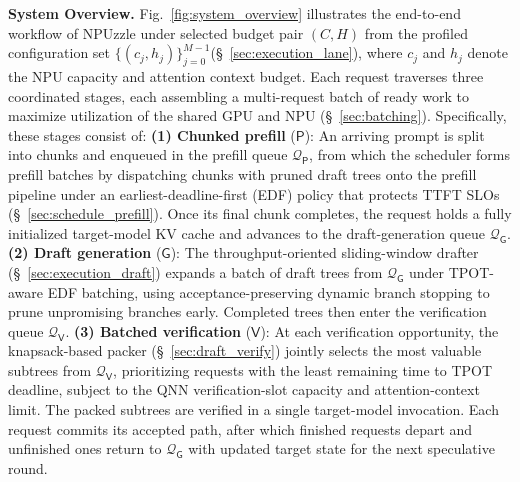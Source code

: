 \documentclass[sigconf,nonacm,10pt]{acmart}
\newcommand{\name}{NPUzzle\xspace}
\begin{document}
\noindent\textbf{System Overview.} 
{\color{blue} Fig.~\ref{fig:system_overview} illustrates the end-to-end workflow of \name under selected budget pair $(C,H)$ from the profiled configuration set $\{(c_j, h_j)\}_{j=0}^{M-1}$(\S~\ref{sec:execution_lane}), where $c_j$ and $h_j$ denote the NPU capacity and attention context budget. Each request traverses three coordinated stages, each assembling a multi-request batch of ready work to maximize utilization of the shared GPU and NPU (\S~\ref{sec:batching}).
Specifically, these stages consist of:}
\textbf{(1) Chunked prefill} ($\mathsf P$): An arriving prompt is split into chunks and enqueued in the prefill queue $\mathcal Q_{\mathsf P}$, from which the scheduler forms prefill batches by dispatching chunks with pruned draft trees onto the prefill pipeline under an earliest-deadline-first (EDF) policy that protects TTFT SLOs (\S~\ref{sec:schedule_prefill}). Once its final chunk completes, the request holds a fully initialized target-model KV cache and advances to the draft-generation queue $\mathcal Q_{\mathsf G}$.
\textbf{(2) Draft generation} ($\mathsf G$): The throughput-oriented sliding-window drafter (\S~\ref{sec:execution_draft}) expands  a batch of draft trees from $\mathcal Q_{\mathsf G}$ under TPOT-aware EDF batching, using acceptance-preserving dynamic branch stopping to prune unpromising branches early. Completed trees then enter the verification queue $\mathcal Q_{\mathsf V}$.
\textbf{(3) Batched verification} ($\mathsf V$): At each verification opportunity, {\color{red}the knapsack-based packer (\S~\ref{sec:draft_verify})} jointly selects the most valuable subtrees from $\mathcal Q_{\mathsf V}$, prioritizing requests with the least remaining time to TPOT deadline, subject to the QNN verification-slot capacity and attention-context limit. The packed subtrees are verified in a single target-model invocation. Each request commits its accepted path, after which finished requests depart and unfinished ones return to $\mathcal Q_{\mathsf G}$ with updated target state for the next speculative round.
\end{document}
